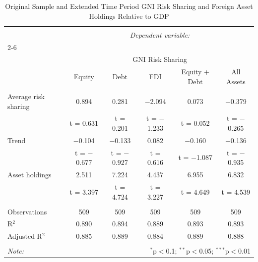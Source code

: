 
\begin{table}[!htbp] \centering 
  \caption{Original Sample and Extended Time Period GNI Risk Sharing and Foreign Asset Holdings Relative to GDP} 
  \label{} 
\begin{tabular}{@{\extracolsep{5pt}}lccccc} 
\\[-1.8ex]\hline 
\hline \\[-1.8ex] 
 & \multicolumn{5}{c}{\textit{Dependent variable:}} \\ 
\cline{2-6} 
\\[-1.8ex] & \multicolumn{5}{c}{GNI Risk Sharing} \\ 
 & Equity & Debt & FDI & Equity + Debt & All Assets \\ 
\hline \\[-1.8ex] 
 Average risk sharing & 0.894 & 0.281 & $-$2.094 & 0.073 & $-$0.379 \\ 
  & t = 0.631 & t = 0.201 & t = $-$1.233 & t = 0.052 & t = $-$0.265 \\ 
  Trend & $-$0.104 & $-$0.133 & 0.082 & $-$0.160 & $-$0.136 \\ 
  & t = $-$0.677 & t = $-$0.927 & t = 0.616 & t = $-$1.087 & t = $-$0.935 \\ 
  Asset holdings & 2.511 & 7.224 & 4.437 & 6.955 & 6.832 \\ 
  & t = 3.397 & t = 4.724 & t = 3.227 & t = 4.649 & t = 4.539 \\ 
 \hline \\[-1.8ex] 
Observations & 509 & 509 & 509 & 509 & 509 \\ 
R$^{2}$ & 0.890 & 0.894 & 0.889 & 0.893 & 0.893 \\ 
Adjusted R$^{2}$ & 0.885 & 0.889 & 0.884 & 0.889 & 0.888 \\ 
\hline 
\hline \\[-1.8ex] 
\textit{Note:}  & \multicolumn{5}{r}{$^{*}$p$<$0.1; $^{**}$p$<$0.05; $^{***}$p$<$0.01} \\ 
\end{tabular} 
\end{table} 
